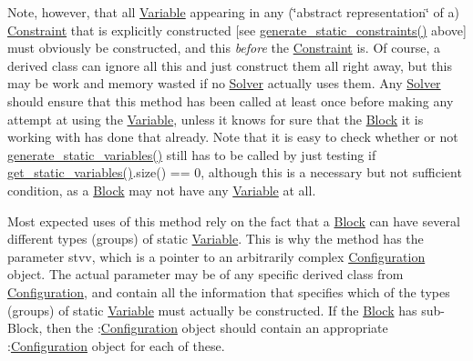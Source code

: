 Note, however, that all \mbox{\hyperlink{class_s_m_spp__di__unipi__it_1_1_variable}{Variable}} appearing in any (\char`\"{}abstract
representation\char`\"{} of a) \mbox{\hyperlink{class_s_m_spp__di__unipi__it_1_1_constraint}{Constraint}} that is explicitly constructed \mbox{[}see \mbox{\hyperlink{class_s_m_spp__di__unipi__it_1_1_block_add9b4c918157bda66b5183f67953d49b}{generate\+\_\+static\+\_\+constraints()}} above\mbox{]} must obviously be constructed, and this {\itshape before} the \mbox{\hyperlink{class_s_m_spp__di__unipi__it_1_1_constraint}{Constraint}} is. Of course, a derived class can ignore all this and just construct them all right away, but this may be work and memory wasted if no \mbox{\hyperlink{class_s_m_spp__di__unipi__it_1_1_solver}{Solver}} actually uses them. Any \mbox{\hyperlink{class_s_m_spp__di__unipi__it_1_1_solver}{Solver}} should ensure that this method has been called at least once before making any attempt at using the \mbox{\hyperlink{class_s_m_spp__di__unipi__it_1_1_variable}{Variable}}, unless it knows for sure that the \mbox{\hyperlink{class_s_m_spp__di__unipi__it_1_1_block}{Block}} it is working with has done that already. Note that it is easy to check whether or not \mbox{\hyperlink{class_s_m_spp__di__unipi__it_1_1_block_acd79fd0980af547f2f06241cb989094e}{generate\+\_\+static\+\_\+variables()}} still has to be called by just testing if \mbox{\hyperlink{class_s_m_spp__di__unipi__it_1_1_block_a6ca8b345bb506a8ac45eef39887bebea}{get\+\_\+static\+\_\+variables()}}.size() == 0, although this is a necessary but not sufficient condition, as a \mbox{\hyperlink{class_s_m_spp__di__unipi__it_1_1_block}{Block}} may not have any \mbox{\hyperlink{class_s_m_spp__di__unipi__it_1_1_variable}{Variable}} at all.

Most expected uses of this method rely on the fact that a \mbox{\hyperlink{class_s_m_spp__di__unipi__it_1_1_block}{Block}} can have several different types (groups) of static \mbox{\hyperlink{class_s_m_spp__di__unipi__it_1_1_variable}{Variable}}. This is why the method has the parameter stvv, which is a pointer to an arbitrarily complex \mbox{\hyperlink{class_s_m_spp__di__unipi__it_1_1_configuration}{Configuration}} object. The actual parameter may be of any specific derived class from \mbox{\hyperlink{class_s_m_spp__di__unipi__it_1_1_configuration}{Configuration}}, and contain all the information that specifies which of the types (groups) of static \mbox{\hyperlink{class_s_m_spp__di__unipi__it_1_1_variable}{Variable}} must actually be constructed. If the \mbox{\hyperlink{class_s_m_spp__di__unipi__it_1_1_block}{Block}} has sub-\/\+Block, then the \+:\mbox{\hyperlink{class_s_m_spp__di__unipi__it_1_1_configuration}{Configuration}} object should contain an appropriate \+:\mbox{\hyperlink{class_s_m_spp__di__unipi__it_1_1_configuration}{Configuration}} object for each of these.

